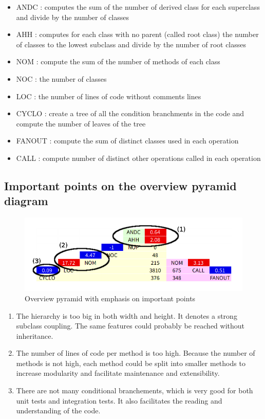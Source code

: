 \begin{itemize}
    \item ANDC : computes the sum of the number of derived class for each superclass and divide by the number of classes
    \item AHH : computes for each class with no parent (called root class) the number of classes to the lowest subclass and divide by the number of root classes
    \item NOM : compute the sum of the number of methods of each class
    \item NOC : the number of classes
    \item LOC : the number of lines of code without comments lines
    \item CYCLO : create a tree of all the condition branchments in the code and compute the number of leaves of the tree
    \item FANOUT : compute the sum of distinct classes used in each operation
    \item CALL : compute number of distinct other operations called in each operation
\end{itemize}

\subsection{Important points on the overview pyramid diagram}

\begin{figure}[H]
    \includegraphics[width=\textwidth]{OverviewPyramid_annotated.png}
    \caption{\label{fig:pyramid}Overview pyramid with emphasis on important points}
\end{figure}

\begin{enumerate}
    \item The hierarchy is too big in both width and height. It denotes a strong subclass coupling. The same features could probably be reached without inheritance.
    \item The number of lines of code per method is too high. Because the number of methods is not high, each method could be split into smaller methods to increase modularity and facilitate maintenance and extensibility.
    \item There are not many conditional branchements, which is very good for both unit tests and integration tests. It also facilitates the reading and understanding of the code.
\end{enumerate}

